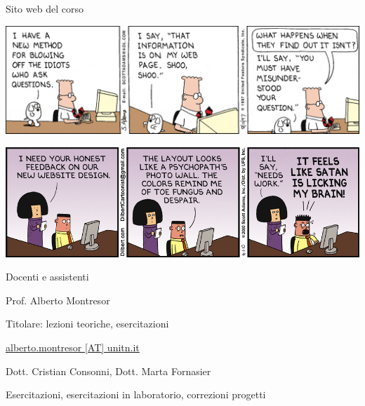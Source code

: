 \begin{frame}{Sito web del corso}
	
\vspace{-15pt}
\begin{center}
\includegraphics[width=1.0\textwidth]{webpage.png}

\includegraphics[width=1.0\textwidth]{style.png}
\end{center}
\end{frame}

\begin{frame}{Docenti e assistenti}
	
\BIL
\item Prof. Alberto Montresor
\BI
\item Titolare: lezioni teoriche, esercitazioni
\item \underline{alberto.montresor [AT] unitn.it}
\EI
\item Dott. Cristian Consonni,  Dott. Marta Fornasier
\BI
\item Esercitazioni, esercitazioni in laboratorio, correzioni progetti
\EI
\EIL
\end{frame}


